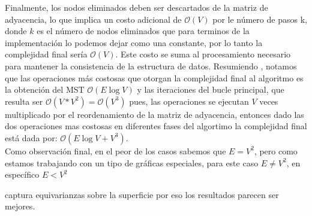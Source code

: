 Finalmente, los nodos eliminados deben ser descartados de la matriz de adyacencia, lo que implica un costo adicional de \( \mathcal{O}(V) \) por le número de pasos k, donde \( k \) es el número de nodos eliminados que para terminos de la implementación lo podemos dejar como una constante, por lo tanto la complejidad final sería $\mathcal{O}(V)$.
 Este costo se suma al procesamiento necesario para mantener la consistencia de la estructura de datos.
Resumiendo , notamos que las operaciones más costosas que otorgan la complejidad final al algoritmo es la obtención del MST $\mathcal{O}(E\log V)$ y las iteraciones del bucle principal, que resulta ser $\mathcal{O}(V * V^2) = \mathcal{O}(V^3)$ pues, las operaciones se ejecutan $V$ veces multiplicado por el reordenamiento de la matriz de adyacencia, entonces dado las dos operaciones mas costosas en diferentes fases del algortimo la complejidad final está dada por: $\mathcal{O}(E \log V +  V^3)$. 
\\Como observación final, en el peor de los casos sabemos que $E = V^2$, pero como estamos trabajando con un tipo de gráficas especiales, para este caso $E \neq V^2$, en específico $E < V^2$


captura equivarianzas sobre la superficie por eso los resultados parecen ser mejores.